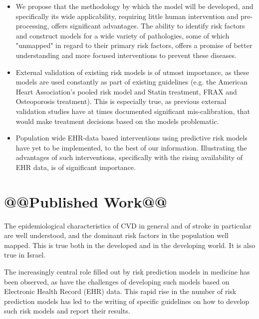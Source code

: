 \documentclass[a4paper,12pt]{article}
\begin{document}
	\begin{itemize}
		
		\item We propose that the methodology by which the model will be developed, and specifically its wide applicability, requiring little human intervention and pre-processing, offers significant advantages. The ability to identify risk factors and construct models for a wide variety of pathologies, some of which "unmapped" in regard to their primary risk factors, offers a promise of better understanding and more focused interventions to prevent these diseases.

		\item External validation of existing risk models is of utmost importance\cite{Moons2012}, as these models are used constantly as part of existing guidelines (e.g. the American Heart Association's pooled risk model and Statin treatment\cite{Goff2014}, FRAX and Osteoporosis treatment\cite{Kanis2008}). This is especially true, as previous external validation studies have at times documented significant mis-calibration\cite{Bastuji-Garin2002,Dagan2017}, that would make treatment decisions based on the models problematic.
		
		\item Population wide EHR-data based interventions using predictive risk models have yet to be implemented, to the best of our information. Illustrating the advantages of such interventions, specifically with the rising availability of EHR data, is of significant importance.
		
	\end{itemize}
	
	\section{@@Published Work@@}
	
	The epidemiological characteristics of CVD in general and of stroke in particular are well understood\cite{Koton2014,Vangen-Loenne2017}, and the dominant risk factors in the population well mapped\cite{Yusuf2004,ODonnell2016}. This is true both in the developed and in the developing world\cite{Lozano2012}. It is also true in Israel\cite{ICDC2017}.
	
	The increasingly central role filled out by risk prediction models in medicine has been observed\cite{Moons2009}, as have the challenges of developing such models based on Electronic Health Record (EHR) data\cite{Goldstein2016,Goldstein2017}. This rapid rise in the number of risk prediction models has led to the writing of specific guidelines on how to develop such risk models and report their results\cite{Collins2015}.
	
\end{document}
